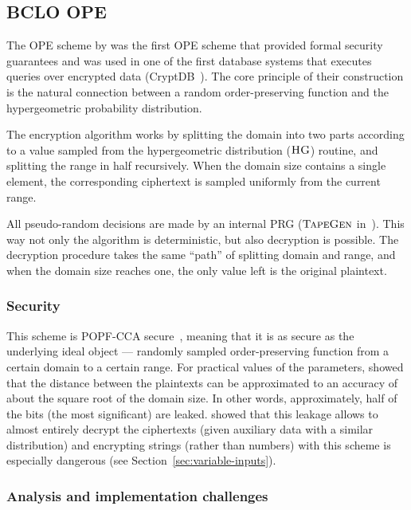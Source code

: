 \subsection{BCLO OPE}

	The OPE scheme by \textcite{bclo-ope} was the first OPE scheme that provided formal security guarantees and was used in one of the first database systems that executes queries over encrypted data (CryptDB~\cite{crypt-db}).
 	The core principle of their construction is the natural connection between a random order-preserving function and the hypergeometric probability distribution.

	The encryption algorithm works by splitting the domain into two parts according to a value sampled from the hypergeometric distribution ($\textsc{HG}$) routine, and splitting the range in half recursively.
	When the domain size contains a single element, the corresponding ciphertext is sampled uniformly from the current range.

	All pseudo-random decisions are made by an internal PRG ($\textsc{TapeGen}$ in~\cite{bclo-ope}).
	This way not only the algorithm is deterministic, but also decryption is possible.
	The decryption procedure takes the same ``path'' of splitting domain and range, and when the domain size reaches one, the only value left is the original plaintext.

	\subsubsection{Security}
		This scheme is POPF-CCA secure~\cite{bclo-ope}, meaning that it is as secure as the underlying ideal object --- randomly sampled order-preserving function from a certain domain to a certain range.
		For practical values of the parameters, \textcite{ope-leakage} showed that the distance between the plaintexts can be approximated to an accuracy of about the square root of the domain size.
		In other words, approximately, half of the bits (the most significant) are leaked.
		\textcite{leakage-abuse-grubs-2017} showed that this leakage allows to almost entirely decrypt the ciphertexts (given auxiliary data with a similar distribution) and encrypting strings (rather than numbers) with this scheme is especially dangerous (see Section~\ref{sec:variable-inputs}).

	\subsubsection{Analysis and implementation challenges}

